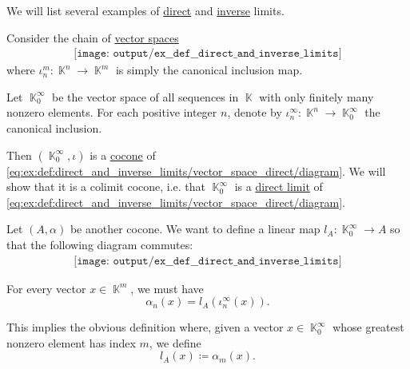 \begin{example}\label{ex:def:direct_and_inverse_limits}
  We will list several examples of \hyperref[def:direct_and_inverse_limits/direct]{direct} and \hyperref[def:direct_and_inverse_limits/inverse]{inverse} limits.

  \begin{thmenum}
     Consider the chain of \hyperref[def:vector_space]{vector spaces}
    \begin{equation}\label{eq:ex:def:direct_and_inverse_limits/vector_space_direct/diagram}
      \begin{aligned}
        \texttt{[image: output/ex\_\_def\_\_direct\_and\_inverse\_limits]}
      \end{aligned}
    \end{equation}
    where \( \iota_n^m: \BbbK^n \to \BbbK^m \) is simply the canonical inclusion map.

    Let \( \BbbK_0^\infty \) be the vector space of all sequences in \( \BbbK \) with only finitely many nonzero elements. For each positive integer \( n \), denote by \( \iota_n^\infty: \BbbK^n \to \BbbK_0^\infty \) the canonical inclusion.

    Then \( (\BbbK_0^\infty, \iota) \) is a \hyperref[def:category_of_cones/cocone]{cocone} of \eqref{eq:ex:def:direct_and_inverse_limits/vector_space_direct/diagram}. We will show that it is a colimit cocone, i.e. that \( \BbbK_0^\infty \) is a \hyperref[def:direct_and_inverse_limits]{direct limit} of \eqref{eq:ex:def:direct_and_inverse_limits/vector_space_direct/diagram}.

    Let \( (A, \alpha) \) be another cocone. We want to define a linear map \( l_A: \BbbK_0^\infty \to A \) so that the following diagram commutes:
    \begin{equation}\label{eq:ex:def:direct_and_inverse_limits/vector_space_direct/limit}
      \begin{aligned}
        \texttt{[image: output/ex\_\_def\_\_direct\_and\_inverse\_limits]}
      \end{aligned}
    \end{equation}

    For every vector \( x \in \BbbK^m \), we must have
    \begin{equation*}
      \alpha_n(x) = l_A(\iota_n^\infty(x)).
    \end{equation*}

    This implies the obvious definition where, given a vector \( x \in \BbbK_0^\infty \) whose greatest nonzero element has index \( m \), we define
    \begin{equation*}
      l_A(x) \coloneqq \alpha_m(x).
    \end{equation*}


\end{thmenum}
\end{example}
